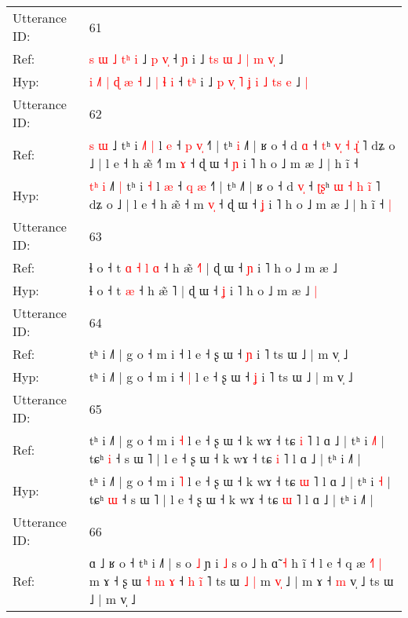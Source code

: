 \documentclass[10pt]{article}
\DeclareRobustCommand{\hl}[1]{{\textcolor{red}{#1}}}
\begin{document}
\begin{longtable}{ll}
 \\
\midrule
Utterance ID: & 61 \\
Ref: & \hl{s} \hl{}\hl{ɯ} \hl{˩} \hl{}\hl{t}\hl{ʰ} \hl{i} ˩ \hl{p} \hl{}\hl{v}\hl{̩} ˧ \hl{}\hl{ɲ} i ˩\hl{}\hl{} \hl{t}\hl{s} \hl{ɯ} \hl{˩} \hl{|} \hl{m} \hl{}\hl{}\hl{v}\hl{̩} ˩\hl{}\hl{}
 \\
Hyp: & \hl{i} \hl{˩}\hl{˥} \hl{|} \hl{ɖ}\hl{ }\hl{æ} \hl{˧} ˩ \hl{|} \hl{ɬ}\hl{ }\hl{i} ˧ \hl{t}\hl{ʰ} i ˩\hl{ }\hl{p} \hl{v}\hl{̩} \hl{˥} \hl{ʝ} \hl{i} \hl{˩} \hl{t}\hl{s}\hl{ }\hl{e} ˩\hl{ }\hl{|}
 \\
\midrule
Utterance ID: & 62 \\
Ref: & \hl{}\hl{s} \hl{ɯ} ˩\hl{}\hl{}\hl{} tʰ i\hl{ }\hl{˩}\hl{˥} \hl{|} l \hl{e} ˧ \hl{p} \hl{v}\hl{̩} ˧˥ | tʰ\hl{ }\hl{i} ˩˥ | ʁ o ˧ d \hl{}\hl{ɑ} ˧ \hl{}\hl{t}ʰ \hl{}\hl{v}\hl{̩} \hl{˧} \hl{ɻ}\hl{̍} ˥ dʑ o ˩ | l e ˧ h æ̃ ˧\hl{˥} m \hl{}\hl{ɤ} ˧ ɖ ɯ ˧ \hl{ɲ} i ˥ h o ˩ m æ ˩ | h ĩ ˧\hl{}\hl{}
 \\
Hyp: & \hl{t}\hl{ʰ} \hl{i} ˩\hl{˥}\hl{ }\hl{|} tʰ i\hl{}\hl{}\hl{} \hl{˧} l \hl{æ} ˧ \hl{q} \hl{}\hl{æ} ˧˥ | tʰ\hl{}\hl{} ˩˥ | ʁ o ˧ d \hl{v}\hl{̩} ˧ \hl{ʈ}\hl{ʂ}ʰ \hl{ɯ}\hl{ }\hl{˧} \hl{h} \hl{i}\hl{̃} ˥ dʑ o ˩ | l e ˧ h æ̃ ˧\hl{} m \hl{v}\hl{̩} ˧ ɖ ɯ ˧ \hl{ʝ} i ˥ h o ˩ m æ ˩ | h ĩ ˧\hl{ }\hl{|}
 \\
\midrule
Utterance ID: & 63 \\
Ref: & ɬ o ˧ t\hl{ }\hl{ɑ}\hl{ }\hl{˧}\hl{ }\hl{l} \hl{ɑ} ˧ h æ̃ \hl{˧}˥ | ɖ ɯ ˧ \hl{ɲ} i ˥ h o ˩ m æ ˩\hl{}\hl{}
 \\
Hyp: & ɬ o ˧ t\hl{}\hl{}\hl{}\hl{}\hl{}\hl{} \hl{æ} ˧ h æ̃ \hl{}˥ | ɖ ɯ ˧ \hl{ʝ} i ˥ h o ˩ m æ ˩\hl{ }\hl{|}
 \\
\midrule
Utterance ID: & 64 \\
Ref: & tʰ i ˩˥ | g o ˧ m i ˧\hl{}\hl{} l e ˧ ʂ ɯ ˧ \hl{ɲ} i ˥ ts ɯ ˩ | m v̩ ˩
 \\
Hyp: & tʰ i ˩˥ | g o ˧ m i ˧\hl{ }\hl{|} l e ˧ ʂ ɯ ˧ \hl{ʝ} i ˥ ts ɯ ˩ | m v̩ ˩
 \\
\midrule
Utterance ID: & 65 \\
Ref: & tʰ i ˩˥ | g o ˧ m i \hl{˧} l e ˧ ʂ ɯ ˧ k wɤ ˧ tɕ \hl{i} ˥ l ɑ ˩ | tʰ i \hl{˩}\hl{˥} | tɕʰ \hl{i} ˧ s ɯ ˥ | l e ˧ ʂ ɯ ˧ k wɤ ˧ tɕ \hl{i} ˥ l ɑ ˩ | tʰ i ˩˥ |
 \\
Hyp: & tʰ i ˩˥ | g o ˧ m i \hl{˥} l e ˧ ʂ ɯ ˧ k wɤ ˧ tɕ \hl{ɯ} ˥ l ɑ ˩ | tʰ i \hl{}\hl{˧} | tɕʰ \hl{ɯ} ˧ s ɯ ˥ | l e ˧ ʂ ɯ ˧ k wɤ ˧ tɕ \hl{ɯ} ˥ l ɑ ˩ | tʰ i ˩˥ |
 \\
\midrule
Utterance ID: & 66 \\
Ref: & ɑ ˩ ʁ o ˧\hl{}\hl{} tʰ i ˩˥ | s o \hl{˩} ɲ i\hl{}\hl{} \hl{˩} s o ˩ h ɑ̃ \hl{˧} h ĩ ˧\hl{}\hl{} l e ˧ q æ \hl{˧}˥\hl{ }\hl{|} m ɤ ˧ ʂ ɯ\hl{ }\hl{˧}\hl{ }\hl{m}\hl{ }\hl{ɤ} ˧ \hl{h} \hl{ĩ} ˥ ts ɯ\hl{ }\hl{˩}\hl{ }\hl{|} m\hl{ }\hl{v}\hl{̩} ˩ | m ɤ ˧\hl{}\hl{}\hl{} \hl{m} v̩ ˩ ts ɯ ˩ | m v̩ ˩\hl{}\hl{}

\end{longtable}
\end{document}
